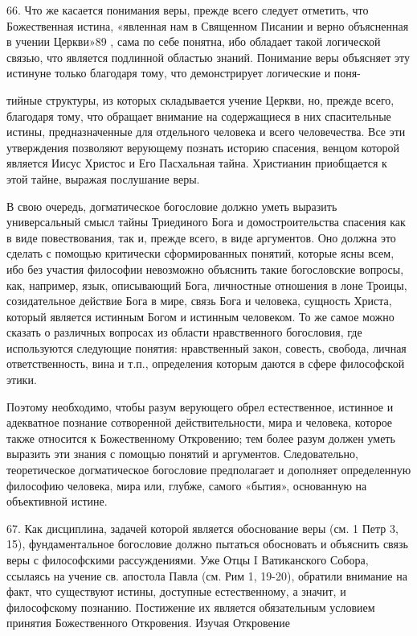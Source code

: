 \documentclass[a5paper,10pt]{article}
\begin{document}
66. Что же касается понимания веры, прежде всего следует отметить, что
Божественная истина, «явленная нам в Священном Писании и верно объясненная в
учении Церкви»89 , сама по себе понятна, ибо обладает такой логической связью,
что является подлинной областью знаний. Понимание веры объясняет эту истинуне
только благодаря тому, что демонстрирует логические и поня-

тийные структуры, из которых складывается учение Церкви, но, прежде всего,
благодаря тому, что обращает внимание на содержащиеся в них спасительные
истины, предназначенные для отдельного человека и всего человечества. Все эти
утверждения позволяют верующему познать историю спасения, венцом которой
является Иисус Христос и Его Пасхальная тайна. Христианин приобщается к этой
тайне, выражая послушание веры.

В свою очередь, догматическое богословие должно уметь выразить универсальный
смысл тайны Триединого Бога и домостроительства спасения как в виде
повествования, так и, прежде всего, в виде аргументов. Оно должна это сделать с
помощью критически сформированных понятий, которые ясны всем, ибо без участия
философии невозможно объяснить такие богословские вопросы, как, например, язык,
описывающий Бога, личностные отношения в лоне Троицы, созидательное действие
Бога в мире, связь Бога и человека, сущность Христа, который является истинным
Богом и истинным человеком. То же самое можно сказать о различных вопросах из
области нравственного богословия, где используются следующие понятия:
нравственный закон, совесть, свобода, личная ответственность, вина и т.п.,
определения которым даются в сфере философской этики.

Поэтому необходимо, чтобы разум верующего обрел естественное, истинное и
адекватное познание сотворенной действительности, мира и человека, которое
также относится к Божественному Откровению; тем более разум должен уметь
выразить эти знания с помощью понятий и аргументов. Следовательно,
теоретическое догматическое богословие предполагает и дополняет определенную
философию человека, мира или, глубже, самого «бытия», основанную на объективной
истине.

67. Как дисциплина, задачей которой является обоснование веры (см. 1 Петр 3,
15), фундаментальное богословие должно пытаться обосновать и объяснить связь
веры с философскими рассуждениями. Уже Отцы I Ватиканского Собора, ссылаясь на
учение св. апостола Павла (см. Рим 1, 19-20), обратили внимание на факт, что
существуют истины, доступные естественному, а значит, и философскому познанию.
Постижение их является обязательным условием принятия Божественного Откровения.
Изучая Откровение
\end{document}
